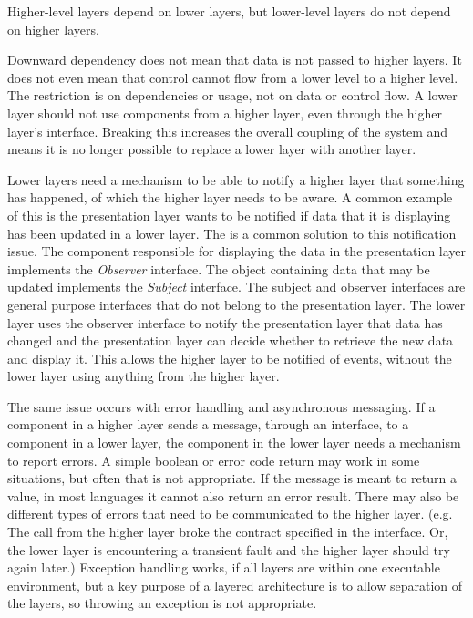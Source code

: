 \begin{definition}
    Higher-level layers depend on lower layers, but lower-level layers do not depend on higher layers.
\end{definition}

Downward dependency does not mean that data is not passed to higher layers.
It does not even mean that control cannot flow from a lower level to a higher level.
The restriction is on dependencies or usage, not on data or control flow.
A lower layer should not use components from a higher layer, even through the higher layer's interface.
Breaking this increases the overall coupling of the system and means it is no longer possible to replace a lower layer with another layer.

Lower layers need a mechanism to be able to notify a higher layer that something has happened, of which the higher layer needs to be aware.
A common example of this is the presentation layer wants to be notified if data that it is displaying has been updated in a lower layer.
The  is a common solution to this notification issue.
The component responsible for displaying the data in the presentation layer implements the \emph{Observer} interface.
The object containing data that may be updated implements the \emph{Subject} interface.
The subject and observer interfaces are general purpose interfaces that do not belong to the presentation layer.
The lower layer uses the observer interface to notify the presentation layer that data has changed and
the presentation layer can decide whether to retrieve the new data and display it.
This allows the higher layer to be notified of events, without the lower layer using anything from the higher layer.

The same issue occurs with error handling and asynchronous messaging.
If a component in a higher layer sends a message, through an interface, to a component in a lower layer,
the component in the lower layer needs a mechanism to report errors.
A simple boolean or error code return may work in some situations, but often that is not appropriate.
If the message is meant to return a value, in most languages it cannot also return an error result.
There may also be different types of errors that need to be communicated to the higher layer.
(e.g. The call from the higher layer broke the contract specified in the interface.
Or, the lower layer is encountering a transient fault and the higher layer should try again later.)
Exception handling works, if all layers are within one executable environment,
but a key purpose of a layered architecture is to allow separation of the layers,
so throwing an exception is not appropriate.

